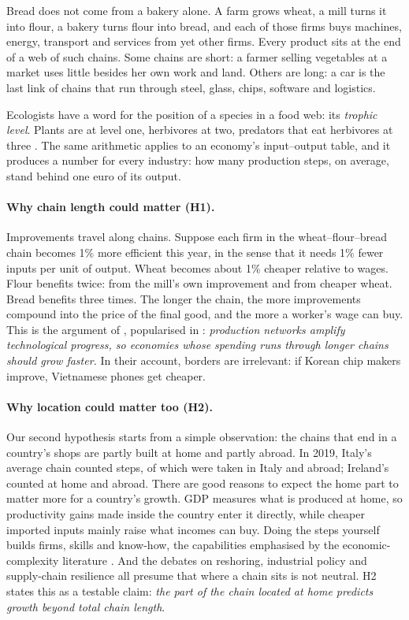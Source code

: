 \documentclass[11pt,a4paper]{article}
\begin{document}
Bread does not come from a bakery alone. A farm grows wheat, a mill turns it into
flour, a bakery turns flour into bread, and each of those firms buys machines,
energy, transport and services from yet other firms. Every product sits at the end
of a web of such chains. Some chains are short: a farmer selling vegetables at a
market uses little besides her own work and land. Others are long: a car is the
last link of chains that run through steel, glass, chips, software and logistics.

Ecologists have a word for the position of a species in a food web: its
\emph{trophic level}. Plants are at level one, herbivores at two, predators that
eat herbivores at three \citep{levine1980}. The same arithmetic applies to an
economy's input--output table, and it produces a number for every industry: how
many production steps, on average, stand behind one euro of its output.

\paragraph{Why chain length could matter (H1).} Improvements travel along chains.
Suppose each firm in the wheat--flour--bread chain becomes 1\% more efficient this
year, in the sense that it needs 1\% fewer inputs per unit of output. Wheat
becomes about 1\% cheaper relative to wages. Flour benefits twice: from the mill's
own improvement and from cheaper wheat. Bread benefits three times. The longer the
chain, the more improvements compound into the price of the final good, and the
more a worker's wage can buy. This is the argument of \citet{mcnerney2022},
popularised in \citet{farmer2024}: \emph{production networks amplify technological
progress, so economies whose spending runs through longer chains should grow
faster.} In their account, borders are irrelevant: if Korean chip makers improve,
Vietnamese phones get cheaper.

\paragraph{Why location could matter too (H2).} Our second hypothesis starts from a
simple observation: the chains that end in a country's shops are partly built at
home and partly abroad. In 2019, Italy's average chain counted \ItaTotal{} steps, of
which \ItaHome{} were taken in Italy and \ItaAbroad{} abroad; Ireland's counted
\IrlHome{} at home and \IrlAbroad{} abroad. There are good reasons to expect the
home part to matter more for a country's growth. GDP measures what is produced at
home, so productivity gains made inside the country enter it directly, while
cheaper imported inputs mainly raise what incomes can buy. Doing the steps
yourself builds firms, skills and know-how, the capabilities emphasised by the
economic-complexity literature \citep{hidalgo2009}. And the debates on reshoring,
industrial policy and supply-chain resilience all presume that where a chain sits
is not neutral. H2 states this as a testable claim: \emph{the part of the chain
located at home predicts growth beyond total chain length}.
\end{document}
